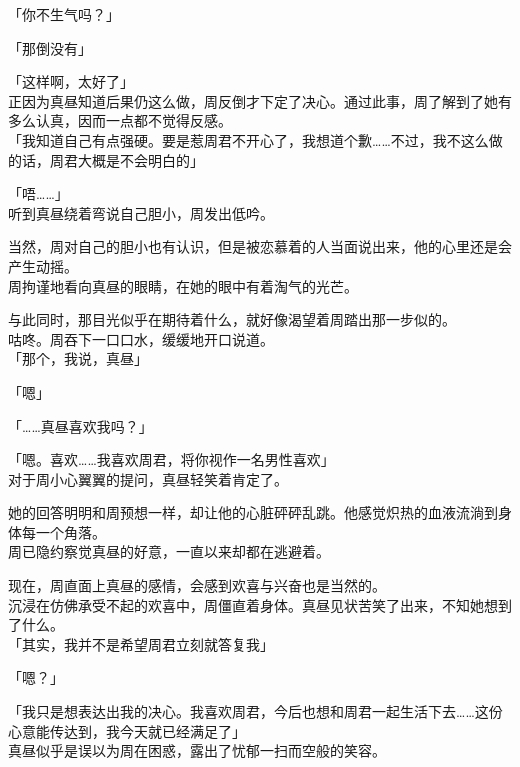 「你不生气吗？」

「那倒没有」

「这样啊，太好了」\\

正因为真昼知道后果仍这么做，周反倒才下定了决心。通过此事，周了解到了她有多么认真，因而一点都不觉得反感。\\

「我知道自己有点强硬。要是惹周君不开心了，我想道个歉……不过，我不这么做的话，周君大概是不会明白的」

「唔……」\\

听到真昼绕着弯说自己胆小，周发出低吟。

当然，周对自己的胆小也有认识，但是被恋慕着的人当面说出来，他的心里还是会产生动摇。\\

周拘谨地看向真昼的眼睛，在她的眼中有着淘气的光芒。

与此同时，那目光似乎在期待着什么，就好像渴望着周踏出那一步似的。\\

咕咚。周吞下一口口水，缓缓地开口说道。\\

「那个，我说，真昼」

「嗯」

「……真昼喜欢我吗？」

「嗯。喜欢……我喜欢周君，将你视作一名男性喜欢」\\

对于周小心翼翼的提问，真昼轻笑着肯定了。

她的回答明明和周预想一样，却让他的心脏砰砰乱跳。他感觉炽热的血液流淌到身体每一个角落。\\

周已隐约察觉真昼的好意，一直以来却都在逃避着。

现在，周直面上真昼的感情，会感到欢喜与兴奋也是当然的。\\

沉浸在仿佛承受不起的欢喜中，周僵直着身体。真昼见状苦笑了出来，不知她想到了什么。\\

「其实，我并不是希望周君立刻就答复我」

「嗯？」

「我只是想表达出我的决心。我喜欢周君，今后也想和周君一起生活下去……这份心意能传达到，我今天就已经满足了」\\

真昼似乎是误以为周在困惑，露出了忧郁一扫而空般的笑容。\\

